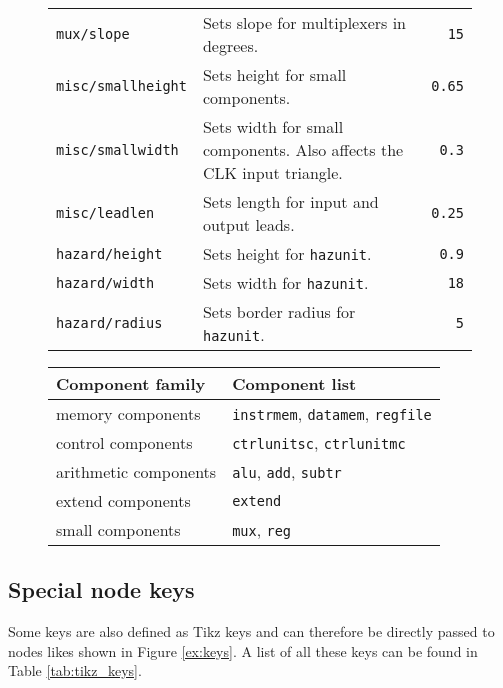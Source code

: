\documentclass[.52pt,a4paper,titlepage]{article}
\begin{document}
\begin{figure}[htbp]
\begin{tabularx}{\textwidth}{|lXr|}
		\texttt{mux/slope}        & Sets slope for multiplexers in degrees.                               & \texttt{15}      \\
		\texttt{misc/smallheight} & Sets height for small components.                                     & \texttt{0.65}    \\
		\texttt{misc/smallwidth}  & Sets width for small components. Also affects the CLK input triangle. & \texttt{0.3}     \\
		\texttt{misc/leadlen}     & Sets length for input and output leads.                               & \texttt{0.25}    \\
		\texttt{hazard/height}    & Sets height for \texttt{hazunit}.                                     & \texttt{0.9}     \\
		\texttt{hazard/width}     & Sets width for  \texttt{hazunit}.                                     & \texttt{18}      \\
		\texttt{hazard/radius}    & Sets border radius for \texttt{hazunit}.                              & \texttt{5}       \\
		\hline
	\end{tabularx}
	\label{tab:keys}
\end{figure}

\begin{figure}[htbp]
	\begin{tabularx}{\textwidth}{|lX|}
		\hline
		Component family      & Component list                                        \\
		\hline
		memory components     & \texttt{instrmem}, \texttt{datamem}, \texttt{regfile} \\
		control components    & \texttt{ctrlunitsc}, \texttt{ctrlunitmc}              \\
		arithmetic components & \texttt{alu}, \texttt{add}, \texttt{subtr}            \\
		extend components     & \texttt{extend}                                       \\
		small components      & \texttt{mux}, \texttt{reg}                            \\
		\hline
	\end{tabularx}
	\label{tab:families}
\end{figure}
\subsection{Special node keys}
Some keys are also defined as  Tikz keys and can therefore be directly passed to nodes likes shown in Figure \ref{ex:keys}. A list of all these keys can be found in Table \ref{tab:tikz_keys}.
\end{document}
